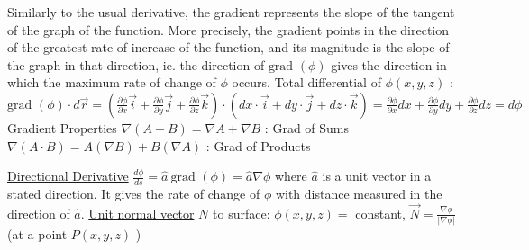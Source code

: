 \documentclass[12pt]{article}
\def\grad{\text{grad\ }} %
\begin{document}
\begin{flushleft}
Similarly to the usual derivative, the gradient represents the slope of the tangent of the graph of the function. More precisely, the gradient points in the direction of the greatest rate of increase of the function, and its magnitude is the slope of the graph in that direction, ie. the direction of $\grad (\phi)$ gives the direction in which the maximum rate of change of $\phi$ occurs. \linebreak 
	\textbullet \quad Total differential of $\phi (x,y,z)$  :  \linebreak 
	$\displaystyle \grad (\phi) \cdot d\vec{r} = \left( \frac{\partial \phi}{\partial x} \vec{i} + \frac{\partial \phi}{\partial y} \vec{j} + \frac{\partial \phi}{\partial z} \vec{k} \right) \cdot \left( dx \cdot \vec{i} + dy \cdot \vec{j} + dz \cdot \vec{k} \right) = \frac{\partial \phi}{\partial x} dx + \frac{\partial \phi}{\partial y} dy + \frac{ \partial \phi}{\partial z} dz = d\phi$ \linebreak 
	Gradient Properties \linebreak 
	\textbullet \quad $\displaystyle \nabla (A + B) = \nabla A + \nabla B$  :  Grad of Sums \linebreak 
	\textbullet \quad $\displaystyle \nabla (A \cdot B) = A ( \nabla B) + B ( \nabla A)$  :  Grad of Products \linebreak 
	
	\textbullet \quad \uline{Directional Derivative} $\displaystyle \frac{d \phi}{d s} = \hat{a}\ \grad (\phi) = \hat{a} \nabla \phi $ \linebreak 
	where $\hat{a}$ is a unit vector in a stated direction. It gives the rate of change of $\phi$ with distance measured in the direction of $\hat{a}$. \linebreak 
	\textbullet \quad \uline{Unit normal vector} $N$ to surface: $\phi (x,y,z) = $ constant, $\displaystyle \vec{N} = \frac{\nabla \phi}{\left| \nabla \phi \right|} $ (at a point $P(x,y,z)$ ) \linebreak 
	

\end{flushleft}
\end{document}
